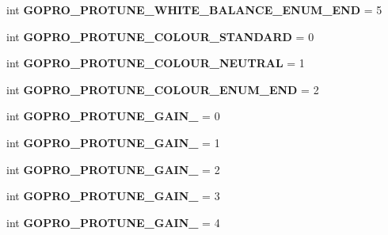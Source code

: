 \begin{DoxyCompactItemize}
int {\bfseries G\+O\+P\+R\+O\+\_\+\+P\+R\+O\+T\+U\+N\+E\+\_\+\+W\+H\+I\+T\+E\+\_\+\+B\+A\+L\+A\+N\+C\+E\+\_\+\+E\+N\+U\+M\+\_\+\+E\+ND} = 5
\item 
\mbox{\label{namespacepymavlink_1_1dialects_1_1v10_a70b966d7e4498ba178f24a27e8620690}} 
int {\bfseries G\+O\+P\+R\+O\+\_\+\+P\+R\+O\+T\+U\+N\+E\+\_\+\+C\+O\+L\+O\+U\+R\+\_\+\+S\+T\+A\+N\+D\+A\+RD} = 0
\item 
\mbox{\label{namespacepymavlink_1_1dialects_1_1v10_a6ed6b29d75172887c84d76bbcd2ad2c9}} 
int {\bfseries G\+O\+P\+R\+O\+\_\+\+P\+R\+O\+T\+U\+N\+E\+\_\+\+C\+O\+L\+O\+U\+R\+\_\+\+N\+E\+U\+T\+R\+AL} = 1
\item 
\mbox{\label{namespacepymavlink_1_1dialects_1_1v10_aabb684ba216e95c785c86ae3581dd08a}} 
int {\bfseries G\+O\+P\+R\+O\+\_\+\+P\+R\+O\+T\+U\+N\+E\+\_\+\+C\+O\+L\+O\+U\+R\+\_\+\+E\+N\+U\+M\+\_\+\+E\+ND} = 2
\item 
\mbox{\label{namespacepymavlink_1_1dialects_1_1v10_ad692c2f8aecfc3f98e512c9699fd98a9}} 
int {\bfseries G\+O\+P\+R\+O\+\_\+\+P\+R\+O\+T\+U\+N\+E\+\_\+\+G\+A\+I\+N\+\_} = 0
\item 
\mbox{\label{namespacepymavlink_1_1dialects_1_1v10_a923735f490faacaeca541d0a55a2528a}} 
int {\bfseries G\+O\+P\+R\+O\+\_\+\+P\+R\+O\+T\+U\+N\+E\+\_\+\+G\+A\+I\+N\+\_} = 1
\item 
\mbox{\label{namespacepymavlink_1_1dialects_1_1v10_a3b4d218b3c8817a3479544667a435b8d}} 
int {\bfseries G\+O\+P\+R\+O\+\_\+\+P\+R\+O\+T\+U\+N\+E\+\_\+\+G\+A\+I\+N\+\_} = 2
\item 
\mbox{\label{namespacepymavlink_1_1dialects_1_1v10_ac448e5c64b8b5e5ce8aeaebcdd91d9c6}} 
int {\bfseries G\+O\+P\+R\+O\+\_\+\+P\+R\+O\+T\+U\+N\+E\+\_\+\+G\+A\+I\+N\+\_} = 3
\item 
\mbox{\label{namespacepymavlink_1_1dialects_1_1v10_a1a1df05d57ad83c5ed3825a32e104035}} 
int {\bfseries G\+O\+P\+R\+O\+\_\+\+P\+R\+O\+T\+U\+N\+E\+\_\+\+G\+A\+I\+N\+\_} = 4

\end{DoxyCompactItemize}

